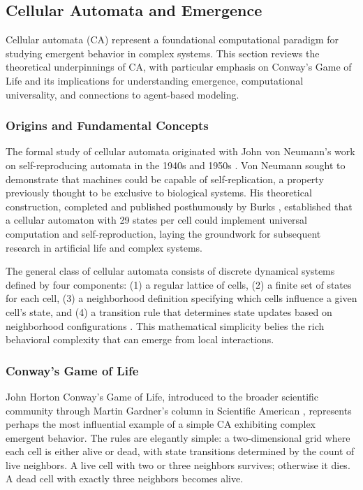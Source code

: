 \subsection{Cellular Automata and Emergence}

Cellular automata (CA) represent a foundational computational paradigm for studying emergent behavior in complex systems. This section reviews the theoretical underpinnings of CA, with particular emphasis on Conway's Game of Life and its implications for understanding emergence, computational universality, and connections to agent-based modeling.

\subsubsection{Origins and Fundamental Concepts}

The formal study of cellular automata originated with John von Neumann's work on self-reproducing automata in the 1940s and 1950s \cite{vonneumann1966theory}. Von Neumann sought to demonstrate that machines could be capable of self-replication, a property previously thought to be exclusive to biological systems. His theoretical construction, completed and published posthumously by Burks \cite{burks1970essays}, established that a cellular automaton with 29 states per cell could implement universal computation and self-reproduction, laying the groundwork for subsequent research in artificial life and complex systems.

The general class of cellular automata consists of discrete dynamical systems defined by four components: (1) a regular lattice of cells, (2) a finite set of states for each cell, (3) a neighborhood definition specifying which cells influence a given cell's state, and (4) a transition rule that determines state updates based on neighborhood configurations \cite{chopard1998cellular}. This mathematical simplicity belies the rich behavioral complexity that can emerge from local interactions.

\subsubsection{Conway's Game of Life}

John Horton Conway's Game of Life, introduced to the broader scientific community through Martin Gardner's column in Scientific American \cite{gardner1970mathematical}, represents perhaps the most influential example of a simple CA exhibiting complex emergent behavior. The rules are elegantly simple: a two-dimensional grid where each cell is either alive or dead, with state transitions determined by the count of live neighbors. A live cell with two or three neighbors survives; otherwise it dies. A dead cell with exactly three neighbors becomes alive.

